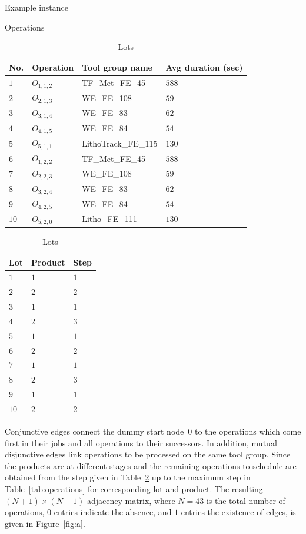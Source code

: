\begin{table}[ht]
	\caption{Example instance}\label{tab:instance} 
	\begin{subtable}{0.5\textwidth}
		\caption{Operations}\label{tab:operations} 
		\centering
		\begin{tabular}{|l|l|l|l|}
			\hline
			No. & Operation & Tool group name & Avg duration (sec) \\ \hline
			$1$ & $O_{1,1,2}$ & TF\_Met\_FE\_45 & $588$ \\
			$2$ & $O_{2,1,3}$ & WE\_FE\_108 & $59$ \\
			$3$ & $O_{3,1,4}$ & WE\_FE\_83 & $62$ \\
			$4$ & $O_{4,1,5}$ & WE\_FE\_84 & $54$ \\
			$5$ & $O_{5,1,1}$ & LithoTrack\_FE\_115 & $130$ \\
			$6$ & $O_{1,2,2}$ & TF\_Met\_FE\_45 & $588$ \\
			$7$ & $O_{2,2,3}$ & WE\_FE\_108 & $59$ \\
			$8$ & $O_{3,2,4}$ & WE\_FE\_83 & $62$ \\
			$9$ & $O_{4,2,5}$ & WE\_FE\_84 & $54$ \\
			$10$ & $O_{5,2,0}$ & Litho\_FE\_111 & $130$ \\
			\hline
		\end{tabular}
	\end{subtable}%
	\begin{subtable}{0.5\textwidth}
		\caption{Lots}\label{tab:lots}
		\centering
		\begin{tabular}{|l|l|l|}
			\hline
			Lot & Product & Step \\ \hline
			$1$ & $1$ & $1$ \\
			$2$ & $2$ & $2$ \\
			$3$ & $1$ & $1$ \\
			$4$ & $2$ & $3$ \\
			$5$ & $1$ & $1$ \\
			$6$ & $2$ & $2$ \\
			$7$ & $1$ & $1$ \\
			$8$ & $2$ & $3$ \\
			$9$ & $1$ & $1$ \\
			$10$ & $2$ & $2$ \\
			\hline
		\end{tabular}
	\end{subtable}
\end{table}

Conjunctive edges connect the dummy start node~$0$ to
the operations which come first in their jobs and all operations to their successors.
In addition, mutual disjunctive edges link operations
to be processed on the same tool group.
Since the products are at different stages and the remaining operations to schedule are obtained from the step given in Table~\ref{tab:lots} up to the maximum step in Table~\ref{tab:operations} for corresponding lot and product. 
The resulting $(N+1)\times(N+1)$ adjacency matrix, where $N=43$ is the
total number of operations, $0$ entries indicate the absence, and
$1$ entries the existence of edges, is given in Figure~\ref{fig:a}.


